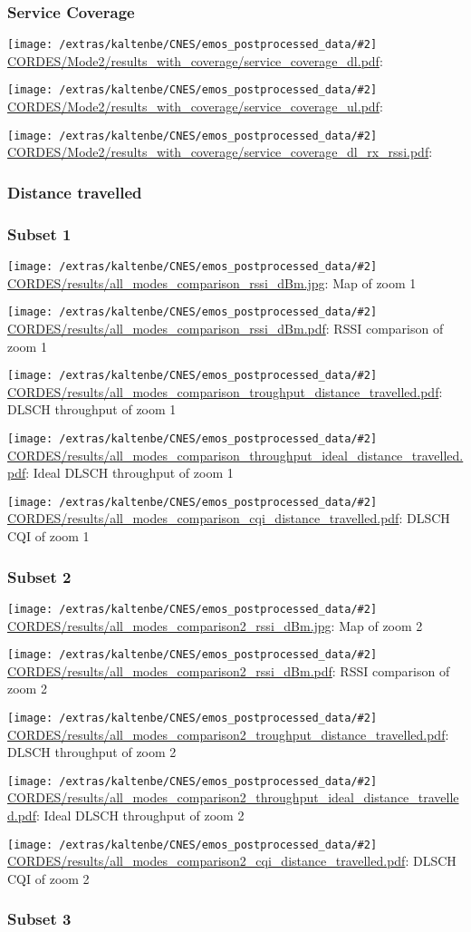 \documentclass[a4paper,10pt]{article}
\newcommand{\printfile}[2][]{
 \begin{minipage}{8cm}
  \centering
  \texttt{[image: /extras/kaltenbe/CNES/emos\_postprocessed\_data/\#2]}
  \url{#2}: #1

 \end{minipage}
}
\begin{document}
\subsubsection{Service Coverage}

\printfile{CORDES/Mode2/results_with_coverage/service_coverage_dl.pdf}
\printfile{CORDES/Mode2/results_with_coverage/service_coverage_ul.pdf}

\printfile{CORDES/Mode2/results_with_coverage/service_coverage_dl_rx_rssi.pdf}

\subsubsection{Distance travelled}
\label{sec:dist_travelled_cordes}


\subsubsection*{Subset 1}

\printfile[Map of zoom 1]{CORDES/results/all_modes_comparison_rssi_dBm.jpg}
\printfile[RSSI comparison of zoom 1]{CORDES/results/all_modes_comparison_rssi_dBm.pdf}

\printfile[DLSCH throughput of zoom 1]{CORDES/results/all_modes_comparison_troughput_distance_travelled.pdf}
\printfile[Ideal DLSCH throughput of zoom 1]{CORDES/results/all_modes_comparison_throughput_ideal_distance_travelled.pdf}

\printfile[DLSCH CQI of zoom 1]{CORDES/results/all_modes_comparison_cqi_distance_travelled.pdf}

\subsubsection*{Subset 2}

\printfile[Map of zoom 2]{CORDES/results/all_modes_comparison2_rssi_dBm.jpg}
\printfile[RSSI comparison of zoom 2]{CORDES/results/all_modes_comparison2_rssi_dBm.pdf}

\printfile[DLSCH throughput of zoom 2]{CORDES/results/all_modes_comparison2_troughput_distance_travelled.pdf}
\printfile[Ideal DLSCH throughput of zoom 2]{CORDES/results/all_modes_comparison2_throughput_ideal_distance_travelled.pdf}

\printfile[DLSCH CQI of zoom 2]{CORDES/results/all_modes_comparison2_cqi_distance_travelled.pdf}

\subsubsection*{Subset 3}
\end{document}
